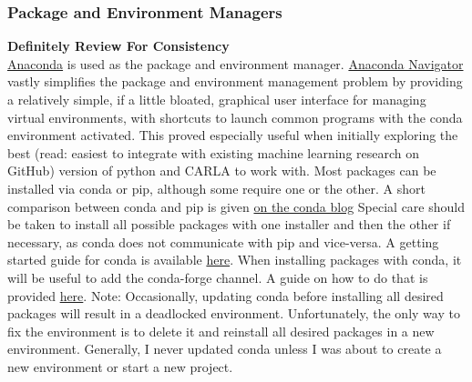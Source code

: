 \documentclass{article}
\begin{document}
\subsubsection{Package and Environment Managers}
\label{subsec: Environment Managers}
\textbf{Definitely Review For Consistency}\\
\href{https://www.anaconda.com/}{Anaconda} is used as the package and environment manager. \href{https://www.anaconda.com/products/navigator}{Anaconda Navigator} vastly simplifies the package and environment management problem by providing a relatively simple, if a little bloated, graphical user interface for managing virtual environments, with shortcuts to launch common programs with the conda environment activated. This proved especially useful when initially exploring the best (read: easiest to integrate with existing machine learning research on GitHub) version of python and CARLA to work with. Most packages can be installed via conda or pip, although some require one or the other. A short comparison between conda and pip is given \href{https://www.anaconda.com/blog/understanding-conda-and-pip}{on the conda blog} Special care should be taken to install all possible packages with one installer and then the other if necessary, as conda does not communicate with pip and vice-versa. %
A getting started guide for conda is available \href{https://docs.conda.io/projects/conda/en/latest/user-guide/getting-started.html}{here}.
When installing packages with conda, it will be useful to add the conda-forge channel. A guide on how to do that is provided \href{https://docs.conda.io/projects/conda/en/latest/user-guide/concepts/channels.html}{here}.
Note: Occasionally, updating conda before installing all desired packages will result in a deadlocked environment. Unfortunately, the only way to fix the environment is to delete it and reinstall all desired packages in a new environment. Generally, I never updated conda unless I was about to create a new environment or start a new project.
\\
\end{document}
